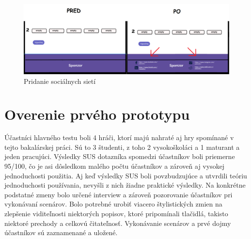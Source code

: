 \begin{figure}[h!]
	
	\includegraphics[width=.9\textwidth]{figures/4}
	
	\centering
	
	\caption{ Pridanie sociálnych sietí \label{4}}
	
\end{figure}





\section*{Overenie prvého prototypu}



Účastníci hlavného testu boli 4 hráči, ktorí majú nahraté aj hry spomínané v tejto bakalárskej práci. Sú to 3 študenti, z toho 2 vysokoškoláci a 1 maturant a jeden pracujúci. Výsledky SUS dotazníka spomedzi účastníkov boli priemerne 95/100, čo je asi dôsledkom malého počtu účastníkov a zároveň aj vysokej jednoduchosti použitia. Aj keď výsledky SUS boli povzbudzujúce a utvrdili teóriu jednoduchosti používania, nevyšli z nich žiadne praktické výsledky. Na konkrétne podstatné zmeny bolo určené interview a zároveň pozorovanie účastníkov pri vykonávaní scenárov. Bolo potrebné urobiť viacero štylistických zmien na zlepšenie viditeľnosti niektorých popisov, ktoré pripomínali tlačidlá, takisto niektoré prechody a celkovú čitateľnosť. Vykonávanie scenárov a prvé dojmy účastníkov sú zaznamenané a uložené.


